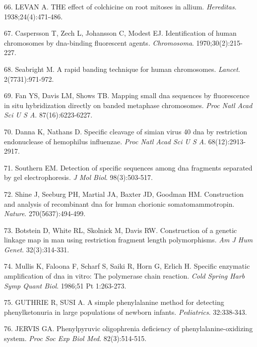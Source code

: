\documentclass[11pt,letterpaper]{book}
\begin{document}
\leavevmode\hypertarget{ref-levan:1938aa}{}%
66. LEVAN A. THE effect of colchicine on root mitoses in allium. \emph{Hereditas}. 1938;24(4):471-486.

\leavevmode\hypertarget{ref-caspersson:1970aa}{}%
67. Caspersson T, Zech L, Johansson C, Modest EJ. Identification of human chromosomes by dna-binding fluorescent agents. \emph{Chromosoma}. 1970;30(2):215-227.

\leavevmode\hypertarget{ref-seabright:1971aa}{}%
68. Seabright M. A rapid banding technique for human chromosomes. \emph{Lancet}. 2(7731):971-972.

\leavevmode\hypertarget{ref-fan:1990aa}{}%
69. Fan YS, Davis LM, Shows TB. Mapping small dna sequences by fluorescence in situ hybridization directly on banded metaphase chromosomes. \emph{Proc Natl Acad Sci U S A}. 87(16):6223-6227.

\leavevmode\hypertarget{ref-danna:1971aa}{}%
70. Danna K, Nathans D. Specific cleavage of simian virus 40 dna by restriction endonuclease of hemophilus influenzae. \emph{Proc Natl Acad Sci U S A}. 68(12):2913-2917.

\leavevmode\hypertarget{ref-southern:1975aa}{}%
71. Southern EM. Detection of specific sequences among dna fragments separated by gel electrophoresis. \emph{J Mol Biol}. 98(3):503-517.

\leavevmode\hypertarget{ref-shine:1977aa}{}%
72. Shine J, Seeburg PH, Martial JA, Baxter JD, Goodman HM. Construction and analysis of recombinant dna for human chorionic somatomammotropin. \emph{Nature}. 270(5637):494-499.

\leavevmode\hypertarget{ref-botstein:1980aa}{}%
73. Botstein D, White RL, Skolnick M, Davis RW. Construction of a genetic linkage map in man using restriction fragment length polymorphisms. \emph{Am J Hum Genet}. 32(3):314-331.

\leavevmode\hypertarget{ref-mullis:1986aa}{}%
74. Mullis K, Faloona F, Scharf S, Saiki R, Horn G, Erlich H. Specific enzymatic amplification of dna in vitro: The polymerase chain reaction. \emph{Cold Spring Harb Symp Quant Biol}. 1986;51 Pt 1:263-273.

\leavevmode\hypertarget{ref-guthrie:1963aa}{}%
75. GUTHRIE R, SUSI A. A simple phenylalanine method for detecting phenylketonuria in large populations of newborn infants. \emph{Pediatrics}. 32:338-343.

\leavevmode\hypertarget{ref-jervis:1953aa}{}%
76. JERVIS GA. Phenylpyruvic oligophrenia deficiency of phenylalanine-oxidizing system. \emph{Proc Soc Exp Biol Med}. 82(3):514-515.
\end{document}
